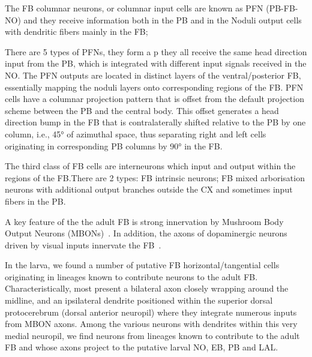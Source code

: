     The FB columnar neurons, or columnar input cells are known as PFN (PB-FB-NO) and they receive information both in the PB and in the Noduli output cells with dendritic fibers mainly in the FB; 


    There are 5 types of PFNs, they form a p they all receive the same head direction input from the PB, which is integrated with different input signals received in the NO. The PFN outputs are located in distinct layers of the ventral/posterior FB, essentially mapping the noduli layers onto corresponding regions of the FB. PFN cells have a columnar projection pattern that is offset from the default projection scheme between the PB and the central body. This offset generates a head direction bump in the FB that is contralaterally shifted relative to the PB by one column, i.e., 45° of azimuthal space, thus separating right and left cells originating in corresponding PB columns by 90° in the FB.

    The third class of FB cells are interneurons which input and output within the regions of the FB.There are 2 types: FB intrinsic neurons; FB mixed arborisation neurons with additional output branches outside the CX and sometimes input fibers in the PB.


    A key feature of the the adult FB is strong innervation by Mushroom Body Output Neurons (MBONs)~\citep{MISSING}. %
    In addition, the axons of dopaminergic neurons driven by visual inputs innervate the FB~\citep{lin2013comprehensive}.




    In the larva, we found a number of putative FB horizontal/tangential cells
    originating in lineages known to contribute neurons to the adult FB. Characteristically, most present a bilateral axon closely wrapping around the midline, and an ipsilateral dendrite positioned within the superior dorsal protocerebrum (dorsal anterior neuropil) where they integrate numerous inputs from MBON axons. Among the various neurons with dendrites within this very medial neuropil, we find neurons from lineages known to contribute to the adult FB and whose axons project to the putative larval NO, EB, PB and LAL.

